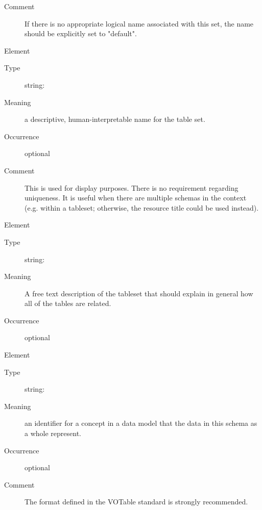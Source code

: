 \documentclass[11pt,a4paper]{ivoa}
\begin{document}
\begin{generated}
\begin{bigdescription}
\begin{description}
\item[Comment] 
               If there is no appropriate logical name associated with
               this set, the name should be explicitly set to
               {"}default{"}.  
             

\end{description}
\item[Element \xmlel{title}]
\begin{description}
\item[Type] string: 
\item[Meaning] 
                  a descriptive, human-interpretable name for the table set.
               
\item[Occurrence] optional
\item[Comment] 
                  This is used for display purposes.  There is no requirement
                  regarding uniqueness.  It is useful when there are
                  multiple schemas in the context (e.g. within a
                  tableset; otherwise, the resource title could be
                  used instead).
               

\end{description}
\item[Element \xmlel{description}]
\begin{description}
\item[Type] string: 
\item[Meaning] 
               A free text description of the tableset that should
               explain in general how all of the tables are related.
             
\item[Occurrence] optional

\end{description}
\item[Element \xmlel{utype}]
\begin{description}
\item[Type] string: 
\item[Meaning] 
                  an identifier for a concept in a data model that
                  the data in this schema as a whole represent.  
               
\item[Occurrence] optional
\item[Comment] 
                  The format defined in the VOTable standard is strongly
                  recommended. 
               


\end{description}
\end{bigdescription}
\end{generated}
\end{document}
